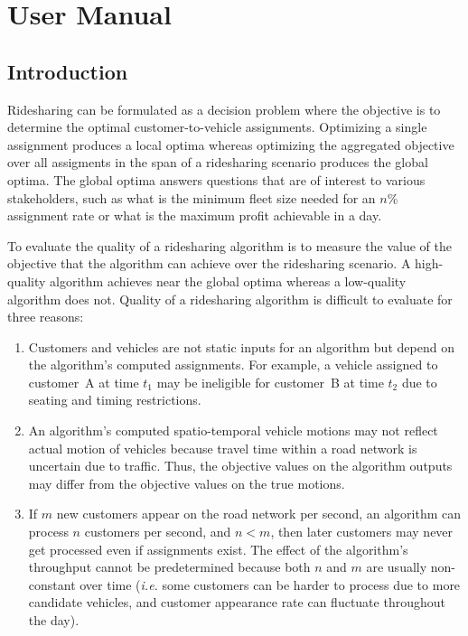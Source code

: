 \part{User Manual}
\chapter{Introduction}
\label{intro}

\renewcommand{\thepage}{\arabic{page}}
\setcounter{page}{1}

Ridesharing can be formulated as a decision problem where the objective is to
determine the optimal customer-to-vehicle assignments. Optimizing a single
assignment produces a local optima whereas optimizing the aggregated
objective over all assigments in the span of a ridesharing scenario produces
the global optima. The global optima answers questions that are of
interest to various stakeholders, such as what is the minimum fleet size needed
for an $n$\% assignment rate or what is the maximum profit achievable in a day.

To evaluate the quality of a ridesharing algorithm is to measure the
value of the objective that the algorithm can achieve over the ridesharing
scenario. A high-quality algorithm achieves near the global optima whereas a
low-quality algorithm does not. Quality of a ridesharing algorithm is difficult
to evaluate for three reasons:
\begin{enumerate}
\item {}
Customers and vehicles are not static inputs for an algorithm but depend on the
algorithm's computed assignments. For example, a vehicle assigned to
customer~A at time $t_1$ may be ineligible for customer~B at time $t_2$ due to
seating and timing restrictions.
\item {}
An algorithm's computed spatio-temporal vehicle motions may not reflect actual
motion of vehicles because travel time within a road network is uncertain due
to traffic. Thus, the objective values on the algorithm outputs may differ from the
objective values on the true motions.
\item {} If $m$ new customers appear on the road network
per second, an algorithm can process $n$ customers per second, and $n<m$, then
later customers may never get processed even if assignments exist. The effect
of the algorithm's throughput cannot be predetermined because both $n$ and $m$
are usually non-constant over time (\textit{i.e.} some customers can be harder
to process due to more candidate vehicles, and customer appearance rate can
fluctuate throughout the day).
\end{enumerate}

